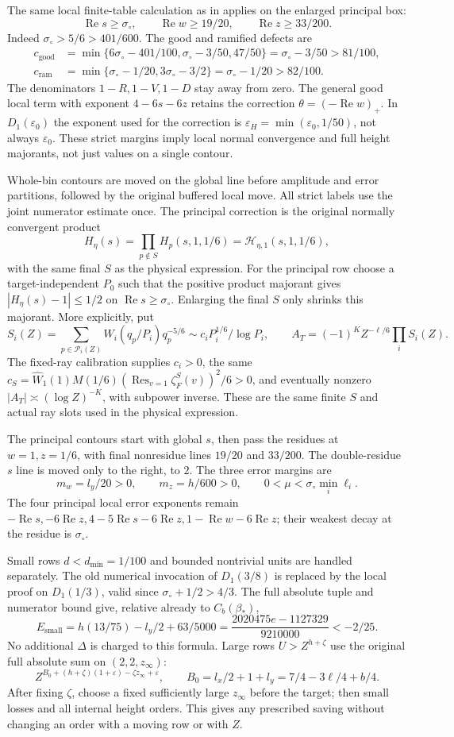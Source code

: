 \documentclass[11pt,a4paper]{article}
\theoremstyle{definition}
\newcommand{\Rea}{\operatorname{Re}}
\newcommand{\eps}{\varepsilon}
\newcommand{\sig}{\sigma_\circ}
\newcommand{\bet}{\beta_*}
\begin{document}
The same local finite-table calculation as in \cite{Previous}
applies on the enlarged principal box:
\[
 \Rea s\ge\sig,\qquad
 \Rea w\ge19/20,\qquad \Rea z\ge33/200.
\]
Indeed $\sig>5/6>401/600$. The good and ramified defects are
\begin{align*}
 c_{\mathrm{good}}
 &=\min\{6\sig-401/100,\sig-3/50,47/50\}
   =\sig-3/50>81/100,\\
 c_{\mathrm{ram}}
 &=\min\{\sig-1/20,3\sig-3/2\}
   =\sig-1/20>82/100.
\end{align*}
The denominators $1-R,1-V,1-D$ stay away from zero.
The general good local term with exponent $4-6s-6z$ retains
the correction $\theta=(-\Rea w)_+$.
In $D_1(\eps_0)$ the exponent used for the correction is
$\eps_H=\min(\eps_0,1/50)$, not always $\eps_0$.
These strict margins imply local normal convergence and full
height majorants, not just values on a single contour.

Whole-bin contours are moved on the global line before amplitude
and error partitions, followed by the original buffered local move.
All strict labels use the joint numerator estimate once.
The principal correction is the original normally convergent product
\[
 H_\eta(s)=\prod_{p\notin S}H_p(s,1,1/6)
          =\mathcal H_{\eta,1}(s,1,1/6),
\]
with the same final $S$ as the physical expression.
For the principal row choose a target-independent $P_0$ such that
the positive product majorant gives $|H_\eta(s)-1|\le1/2$ on
$\Rea s\ge\sig$. Enlarging the final $S$ only shrinks this majorant.
More explicitly, put
\[
 S_i(Z)=\sum_{p\in\mathcal P_i(Z)}
 W_i(q_p/P_i)q_p^{-5/6}
 \sim c_iP_i^{1/6}/\log P_i,\qquad
 A_T=(-1)^K Z^{-\ell/6}\prod_i S_i(Z).
\]
The fixed-ray calibration supplies $c_i>0$, the same
$c_S=\widehat W_1(1)M(1/6)
(\operatorname{Res}_{v=1}\zeta_F^S(v))^2/6>0$,
and eventually nonzero $|A_T|\asymp(\log Z)^{-K}$,
with subpower inverse. These are the same finite $S$ and
actual ray slots used in the physical expression.

The principal contours start with global $s$, then pass the
residues at $w=1,z=1/6$, with final nonresidue lines $19/20$ and
$33/200$. The double-residue $s$ line is moved only to the right,
to $2$. The three error margins are
\[
 m_w=l_y/20>0,\qquad m_z=h/600>0,\qquad
 0<\mu<\sig\min_i\ell_i.
\]
The four principal local error exponents remain
$-\Rea s,-6\Rea z,4-5\Rea s-6\Rea z,1-\Rea w-6\Rea z$;
their weakest decay at the residue is $\sig$.

Small rows $d<d_{\min}=1/100$ and bounded nontrivial units are
handled separately. The old numerical invocation of $D_1(3/8)$
is replaced by the local proof on $D_1(1/3)$, valid since
$\sig+1/2>4/3$.
The full absolute tuple and numerator bound give, relative
already to $C_b(\bet)$,
\[
 E_{\mathrm{small}}
 =h(13/75)-l_y/2+63/5000
 =\frac{2020475e-1127329}{9210000}<-2/25.
\]
No additional $\Delta$ is charged to this formula.
Large rows $U>Z^{h+\zeta}$ use the original full absolute sum
on $(2,2,z_\infty)$:
\[
 Z^{B_0+(h+\zeta)(1+\eps)-\zeta z_\infty+\eps},
 \qquad B_0=l_x/2+1+l_y=7/4-3\ell/4+b/4.
\]
After fixing $\zeta$, choose a fixed sufficiently large
$z_\infty$ before the target; then small losses and all internal
height orders. This gives any prescribed saving without changing
an order with a moving row or with $Z$.
\end{document}
